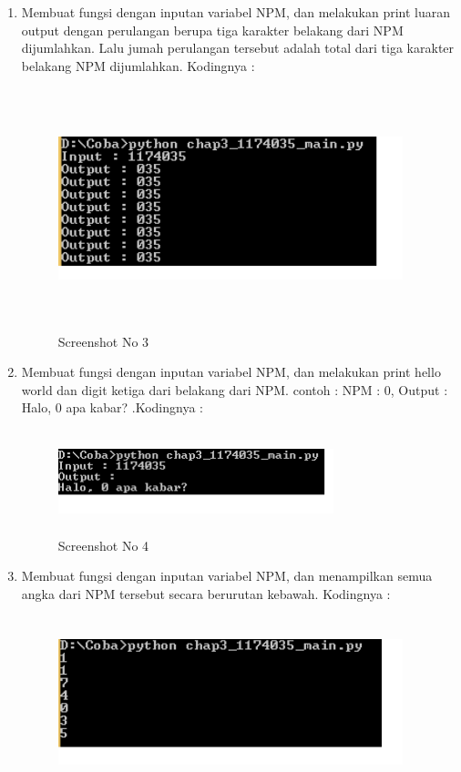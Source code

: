 \begin{enumerate}
\begin{figure}[!htbp]
	\end{figure}
	\item Membuat fungsi dengan inputan variabel NPM, dan melakukan print luaran output dengan perulangan berupa tiga karakter belakang dari NPM dijumlahkan. Lalu jumah perulangan tersebut adalah total dari tiga karakter belakang NPM dijumlahkan. Kodingnya : 
	
	\begin{figure}[!htbp]
        \centering
        \includegraphics[height=7cm, width=10cm]{figures/chapter3/1174035_3.png}
        \caption{Screenshot No 3}
        \label{1174035_3}
	\end{figure}
	\item Membuat fungsi dengan inputan variabel NPM, dan melakukan print hello world dan digit ketiga dari belakang dari NPM. contoh : NPM : 0, Output : Halo, 0 apa kabar? .Kodingnya : 
	
	\begin{figure}[!htbp]
        \centering
        \includegraphics[height=3cm, width=8cm]{figures/chapter3/1174035_4.png}
        \caption{Screenshot No 4}
        \label{1174035_4}
	\end{figure}
	\item Membuat fungsi dengan inputan variabel NPM, dan menampilkan semua angka dari NPM tersebut secara berurutan kebawah. Kodingnya : 
	
	\begin{figure}[!htbp]
        \centering
        \includegraphics[height=5cm, width=10cm]{figures/chapter3/1174035_5.png}

\end{figure}
\end{enumerate}
